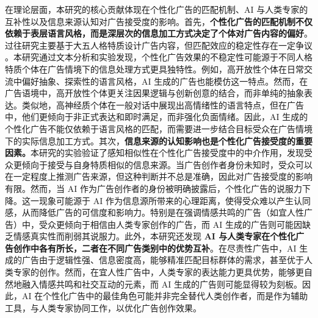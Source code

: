 在理论层面，本研究的核心贡献体现在个性化广告的匹配机制、AI 与人类专家的互补性以及信息来源认知对广告接受度的影响。首先，\textbf{个性化广告的匹配机制不仅依赖于表层语言风格，而是深层次的信息加工方式决定了个体对广告内容的偏好}。过往研究主要基于大五人格特质设计广告内容，但匹配效应的稳定性存在一定争议 \citep{matz2017psychological,winter2021effects}。本研究通过文本分析和实验发现，个性化广告效果的不稳定性可能源于不同人格特质个体在广告情境下的信息处理方式更具独特性。例如，高开放性个体在日常交流中偏好抽象、探索性的语言风格，AI 生成的广告也能模仿这一特点。然而，在广告语境中，高开放性个体更关注因果逻辑与创新创意的结合，而非单纯的抽象表达。类似地，高神经质个体在一般对话中展现出高情绪性的语言特点，但在广告中，他们更倾向于非正式表达和即时满足，而非强化负面情绪。因此，AI 生成的个性化广告不能仅依赖于语言风格的匹配，而需要进一步结合目标受众在广告情境下的实际信息加工方式。其次，\textbf{信息来源的认知影响也是个性化广告接受度的重要因素。}本研究的实验验证了感知相似性在个性化广告接受度中的中介作用，发现受众更倾向于接受与自身特质相似的信息来源。当广告创作者身份未知时，受众可以在一定程度上推测广告来源，但这种判断并不总是准确，因此对广告接受度的影响有限。然而，当 AI 作为广告创作者的身份被明确披露后，个性化广告的说服力下降。这一现象可能源于 AI 作为信息源所带来的心理距离，使得受众难以产生认同感，从而降低广告的可信度和影响力。特别是在强调情感共鸣的广告（如宜人性广告）中，受众更倾向于相信由人类专家创作的广告，而 AI 生成的广告则可能因缺乏情感真实性而削弱其说服力。此外，本研究还发现\textbf{ AI 与人类专家在个性化广告创作中各有所长，二者在不同广告类别中的优势互补}。在尽责性广告中，AI 生成的广告由于逻辑性强、信息密度高，能够精准匹配目标群体的需求，甚至优于人类专家的创作。然而，在宜人性广告中，人类专家的表达能力更具优势，能够更自然地融入情感共鸣和社交互动的元素，而 AI 生成的广告则可能显得较为刻板。因此，AI 在个性化广告中的最佳角色可能并非完全替代人类创作者，而是作为辅助工具，与人类专家协同工作，以优化广告创作效果。

